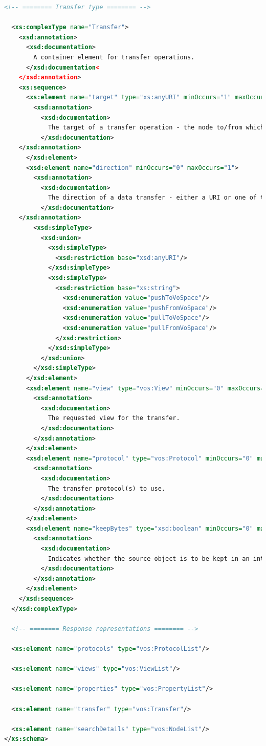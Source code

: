 \documentclass[11pt,a4paper]{ivoa}
\begin{document}
\begin{lstlisting}[language=xml, basicstyle=\scriptsize]
  <!-- ======== Transfer type ======== -->

  <xs:complexType name="Transfer">
    <xsd:annotation>
      <xsd:documentation>
        A container element for transfer operations.
      </xsd:documentation<
    </xsd:annotation>
    <xs:sequence>
      <xs:element name="target" type="xs:anyURI" minOccurs="1" maxOccurs="1">
        <xsd:annotation>
          <xsd:documentation>
            The target of a transfer operation - the node to/from which data is to be transferred.
          </xsd:documentation>
	</xsd:annotation>
      </xsd:element>
      <xsd:element name="direction" minOccurs="0" maxOccurs="1">
        <xsd:annotation>
          <xsd:documentation>
            The direction of a data transfer - either a URI or one of the specified directions
          </xsd:documentation>
	</xsd:annotation>
        <xsd:simpleType>
          <xsd:union>
            <xsd:simpleType>
              <xsd:restriction base="xsd:anyURI"/>
            </xsd:simpleType>
            <xsd:simpleType>   
              <xsd:restriction base="xs:string">
                <xsd:enumeration value="pushToVoSpace"/>
                <xsd:enumeration value="pushFromVoSpace"/>
                <xsd:enumeration value="pullToVoSpace"/>
                <xsd:enumeration value="pullFromVoSpace"/>
              </xsd:restriction>
            </xsd:simpleType>
          </xsd:union>
        </xsd:simpleType>
      </xsd:element>
      <xsd:element name="view" type="vos:View" minOccurs="0" maxOccurs="1">
        <xsd:annotation>
          <xsd:documentation>
            The requested view for the transfer.
          </xsd:documentation>
        </xsd:annotation>
      </xsd:element>
      <xsd:element name="protocol" type="vos:Protocol" minOccurs="0" maxOccurs="unbounded">
        <xsd:annotation>
          <xsd:documentation>
            The transfer protocol(s) to use.
          </xsd:documentation>
        </xsd:annotation>
      </xsd:element>
      <xsd:element name="keepBytes" type="xsd:boolean" minOccurs="0" maxOccurs="1">
        <xsd:annotation>
          <xsd:documentation>
            Indicates whether the source object is to be kept in an internal transfer, i.e., distinguishes between a move and a copy.
          </xsd:documentation>
        </xsd:annotation>        
      </xsd:element>
    </xsd:sequence>
  </xsd:complexType>

  <!-- ======== Response representations ======== -->

  <xs:element name="protocols" type="vos:ProtocolList"/>

  <xs:element name="views" type="vos:ViewList"/>

  <xs:element name="properties" type="vos:PropertyList"/>

  <xs:element name="transfer" type="vos:Transfer"/>
 
  <xs:element name="searchDetails" type="vos:NodeList"/>
</xs:schema>
\end{lstlisting}
\end{document}
